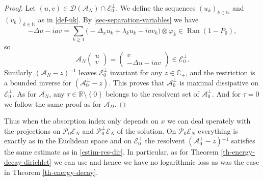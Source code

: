 \documentclass[10pt, a4paper,reqno]{amsart}
\theoremstyle{plain}
\theoremstyle{definition}
\theoremstyle{remark}
\begin{document}
\begin{proof}
Let $(u,v) \in {{\mathcal D}}({{{\mathcal A}}_N}) \cap {{\mathscr E}_0^\bot}$. We define the sequences ${\left({u}_{k}\right)_{k \in{\mathbb{N}}}}$ and ${\left({v}_{k}\right)_{k \in{\mathbb{N}}}}$ as in \eqref{def-uk}. By \eqref{sec-separation-variables} we have 
\[
-{\Delta} u - ia v = \sum_{k {\geqslant} 1} \big( - {{\Delta}_x}  u_k + {\lambda}_k u_k - i a v_k \big) \otimes {\varphi}_k \in \operatorname{Ran}(1-P_0),
\]
so
\[
{{{\mathcal A}}_N} \begin{pmatrix} u \\ v \end{pmatrix} = 
\begin{pmatrix}
v \\
- {\Delta} u -ia v
\end{pmatrix}
\in {{\mathscr E}_0^\bot}.
\]
Similarly $({{{\mathcal A}}_N}-z){^{-1}}$ leaves ${{\mathscr E}_0^\bot}$ invariant for any $z \in {\mathbb{C}}_+$, and the restriction is a bounded inverse for $({{{\mathcal A}}_0^\bot} -z)$. This proves that ${{{\mathcal A}}_0^\bot}$ is maximal dissipative on ${{\mathscr E}_0^\bot}$.
As for ${{{\mathcal A}}_N}$, any ${\tau} \in {\mathbb{R}} \setminus {\left\{ 0 \right\}}$ belongs to the resolvent set of ${{{\mathcal A}}_0^\bot}$. And for ${\tau} = 0$ we follow the same proof as for ${{{\mathcal A}}_D}$.
\end{proof}

Thus when the absorption index only depends on $x$ we can deal sperately with the projections on ${{\mathcal P}}_0{\mathscr E_N}$ and ${{\mathcal P}}_0^\bot {\mathscr E_N}$ of the solution. On ${{\mathcal P}}_0 {\mathscr E_N}$ everything is exactly as in the Euclidean space and on ${{\mathscr E}_0^\bot}$ the resolvent $({{{\mathcal A}}_0^\bot}-z){^{-1}}$ satisfies the same estimate as in \eqref{estim-res-dir}. In particular, as for Theorem \ref{th-energy-decay-dirichlet} we can use \cite{BorichevTo10} and hence we have no logarithmic loss as was the case in Theorem \ref{th-energy-decay}.
\end{document}
